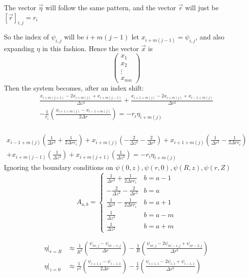 \documentclass{X:/Documents/Coding/Latex/myreport}
\begin{document}
The vector $\vec\eta$ will follow the same pattern, and the vector $\vec r$ will just be $[\vec r]_{i,j} = r_i$


So the index of $\psi_{i,j}$ will be $i + m(j-1)$ let $x_{i+m(j-1)} = \psi_{i,j}$, and also expanding $\eta$ in this fashion.
Hence the vector $\vec x$ is
\[\begin{pmatrix}
    x_1\\
    x_2\\
    \vdots\\
    x_{mn}
\end{pmatrix}\]
Then the system becomes, after an index shift:
\begin{align*}
    \frac{x_{i+m(j+1)} - 2 x_{i+m(j)} + x_{i+m(j-1)}}{\Delta z^2} + \frac{x_{i+1+m(j)} - 2 x_{i+m(j)} + x_{i-1+m(j)}}{\Delta r^2}\\
     - \frac1{r_i} \left( \frac{x_{i+1+m(j)} - x_{i-1+m(j)}}{2 \Delta r}\right) = - r_i \eta_{i+m(j)}\\
\end{align*}

\begin{align*}
        x_{i-1+m(j)}\left(\frac{1}{\Delta r^2} + \frac{1}{2\Delta r r_i}\right) + x_{i+m(j)} \left(-\frac{2}{\Delta z^2} - \frac{2}{\Delta r^2}\right) + x_{i+1+m(j)} \left(\frac{1}{\Delta r^2} - \frac{1}{2\Delta r r_i}\right)\\
        + x_{i+m(j-1)} \left(\frac{1}{\Delta z^2}\right) + x_{i+m(j+1)}\left(\frac{1}{\Delta z^2}\right) = -r_i \eta_{i+m(j)}
\end{align*}
Ignoring the boundary conditions on $\psi(0,z), \psi(r,0), \psi(R,z), \psi(r,Z)$
\[A_{a,b} = \begin{cases}
    \frac{1}{\Delta r^2} + \frac{1}{2\Delta r r_i}  & b = a - 1 \\
    -\frac{2}{\Delta z^2} - \frac{2}{\Delta r^2}    & b = a \\
    \frac{1}{\Delta r^2} - \frac{1}{2\Delta r r_i}  & b = a + 1 \\
    \frac{1}{\Delta z^2}                            & b = a - m \\
    \frac{1}{\Delta z^2}                            & b = a + m 
\end{cases}\]


\begin{align*}
    \eta|_{r=R} &\approx \frac{1}{R^2}\left(\frac{\psi_{nr,j} - \psi_{nr-1,j}}{\Delta r}\right) - \frac{1}{R} \left(\frac{\psi_{nr,j} - 2\psi_{nr-1,j} + \psi_{nr-2,j}}{\Delta r^2}\right) \\
    \eta|_{z=0} &\approx  \frac{1}{r^2} \left(\frac{\psi_{i+1,1} - \psi_{i-1,1}}{2\Delta r}\right) - \frac{1}{r} \left(\frac{\psi_{i+1,1} - 2 \psi_{i,1} + \psi_{i-1,1}}{\Delta r^2}\right)
\end{align*}
\end{document}
